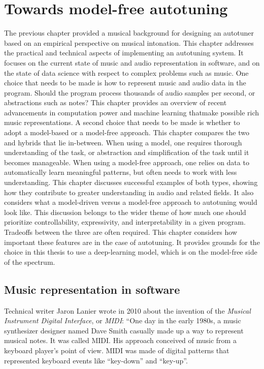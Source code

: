 \chapter{Towards model-free autotuning}
\label{chap:tech-background}
The previous chapter provided a musical background for designing an autotuner based on an empirical perspective on musical intonation. This chapter addresses the practical and technical aspects of implementing an autotuning system. It focuses on the current state of music and audio representation in software, and on the state of data science with respect to complex problems such as music. One choice that needs to be made is how to represent music and audio data in the program. Should the program process thousands of audio samples per second, or abstractions such as notes? This chapter provides an overview of recent advancements in computation power and machine learning thatmake possible rich music representations. A second choice that needs to be made is whether to adopt a model-based or a model-free approach. This chapter compares the two and hybrids that lie in-between. When using a model, one requires thorough understanding of the task, or abstraction and simplification of the task until it becomes manageable. When using a model-free approach, one relies on data to automatically learn meaningful patterns, but often needs to work with less understanding. This chapter discusses successful examples of both types, showing how they contribute to greater understanding in audio and related fields. It also considers what a model-driven versus a model-free approach to autotuning would look like. This discussion belongs to the wider theme of how much one should prioritize controllability, expressivity, and interpretability in a given program. Tradeoffs between the three are often required. This chapter considers how important these features are in the case of autotuning. It provides grounds for the choice in this thesis to use a deep-learning model, which is on the model-free side of the spectrum. 

\section{Music representation in software}
Technical writer Jaron Lanier wrote in 2010 about the invention of the \textit{Musical Instrument Digital Interface}, or \textit{MIDI}: ``One day in the early 1980s, a music synthesizer designer named Dave Smith casually made up a way to represent musical notes. It was called MIDI. His approach conceived of music from a keyboard player's point of view. MIDI was made of digital patterns that represented keyboard events like ``key-down'' and ``key-up''. 

